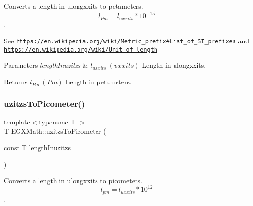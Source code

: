 Converts a length in ulongxxits to petameters. \[ l_{Pm}=l_{uxxits} * 10^{-15} \]. 

See \href{https://en.wikipedia.org/wiki/Metric_prefix#List_of_SI_prefixes}{\tt https\+://en.\+wikipedia.\+org/wiki/\+Metric\+\_\+prefix\#\+List\+\_\+of\+\_\+\+S\+I\+\_\+prefixes} and \href{https://en.wikipedia.org/wiki/Unit_of_length}{\tt https\+://en.\+wikipedia.\+org/wiki/\+Unit\+\_\+of\+\_\+length} 
\begin{DoxyParams}{Parameters}
{\em length\+Inuzitzs} & $ l_{uxxits}\ (uxxits)$ Length in ulongxxits. \\
\hline
\end{DoxyParams}
\begin{DoxyReturn}{Returns}
$ l_{Pm}\ (Pm)$ Length in petameters. 
\end{DoxyReturn}
\mbox{\label{group___e_g_x_math-_conversions-_length_conversions-uzitzs-_s_i_ga48c60a4876ac426d1717096263648a4d}} 
\subsubsection{\texorpdfstring{uzitzs\+To\+Picometer()}{uzitzsToPicometer()}}
{\footnotesize\ttfamily template$<$typename T $>$ \\
T E\+G\+X\+Math\+::uzitzs\+To\+Picometer (\begin{DoxyParamCaption}\item[{const T}]{length\+Inuzitzs }\end{DoxyParamCaption})}



Converts a length in ulongxxits to picometers. \[ l_{pm}=l_{uxxits} * 10^{12} \]. 

